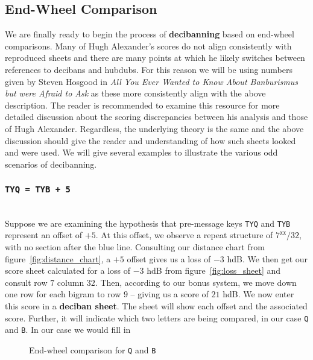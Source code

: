 \subsection{End-Wheel Comparison}
We are finally ready to begin the process of {\bf{decibanning}}
based on end-wheel comparisons. Many of Hugh Alexander's scores do
not align consistently with reproduced sheets and there are many
points at which he likely switches between references to decibans
and hubdubs. For this reason we will be using numbers given by
Steven Hosgood in \emph{All You Ever Wanted to Know About
	Banburismus but were Afraid to Ask} as these more consistently align
with the above description. The reader is recommended to examine
this resource for more detailed discussion about the scoring
discrepancies between his analysis and those of Hugh Alexander.
Regardless, the underlying theory is the same and the above
discussion should give the reader and understanding of how such
sheets looked and were used. We will give several examples to
illustrate the various odd scenarios of decibanning.
\subsubsection{\texttt{TYQ = TYB + 5}}
\text{}\\Suppose we are examining the hypothesis that pre-message
keys \texttt{TYQ} and \texttt{TYB} represent an offset of $+5$. At
this offset, we observe a repeat structure of $7^\texttt{xx}/32$,
with no section after the blue line. Consulting our distance chart
from figure~\ref{fig:distance_chart}, a $+5$ offset gives us a loss
of $-3$ hdB. We then get our score sheet calculated for a loss of
$-3$ hdB from figure~\ref{fig:loss_sheet} and consult row $7$
column $32$. Then, according to our bonus system, we move down one
row for each bigram to row $9$ -- giving us a score of $21$ hdB. We
now enter this score in a  {\bf{deciban sheet}}. The sheet will
show each offset and the associated score. Further, it will
indicate which two letters are being compared, in our case
\texttt{Q} and \texttt{B}. In our case we would fill in

\begin{figure}[H]
	\begin{center}
	\end{center}
	\caption{End-wheel comparison for \texttt{Q} and \texttt{B}}
\end{figure}

